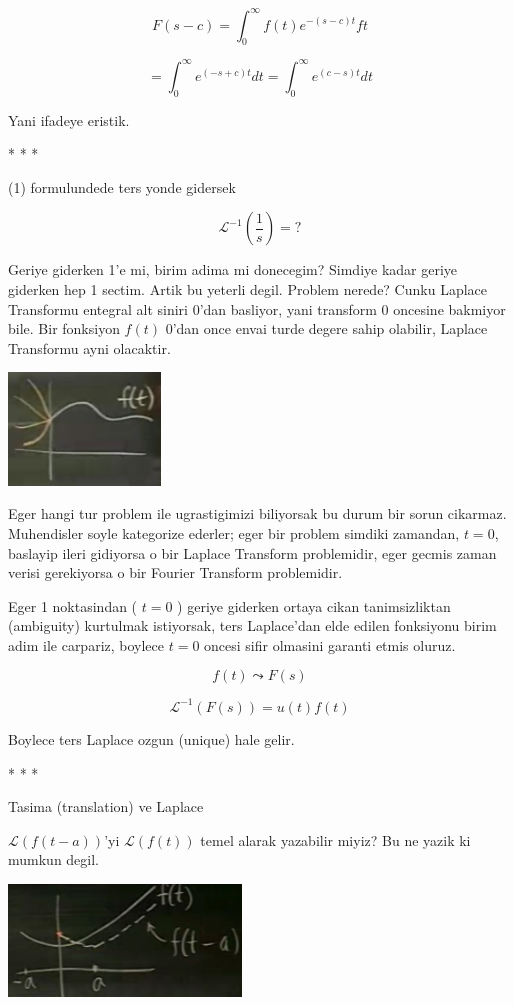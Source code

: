 \documentclass[12pt,fleqn]{article}
\begin{document}
\[ F(s-c) = \int _{0}^{\infty} f(t) e^{-(s-c)t} ft  \]

\[ = \int _{0}^{\infty} e^{(-s+c)t} dt  = \int _{0}^{\infty} e^{(c-s)t} dt   \]

Yani ifadeye eristik. 

* * *

(1) formulundede ters yonde gidersek

\[ \mathcal{L}^{-1}(\frac{1}{s}) = ?  \]

Geriye giderken 1'e mi, birim adima mi donecegim? Simdiye kadar geriye
giderken hep 1 sectim. Artik bu yeterli degil. Problem nerede? Cunku
Laplace Transformu entegral alt siniri 0'dan basliyor, yani transform 0
oncesine bakmiyor bile. Bir fonksiyon $f(t)$ 0'dan once envai turde degere
sahip olabilir, Laplace Transformu ayni olacaktir. 

\includegraphics[height=3cm]{22_6.png}

Eger hangi tur problem ile ugrastigimizi biliyorsak bu durum bir sorun
cikarmaz. Muhendisler soyle kategorize ederler; eger bir problem simdiki
zamandan, $t=0$, baslayip ileri gidiyorsa o bir Laplace Transform
problemidir, eger gecmis zaman verisi gerekiyorsa o bir Fourier Transform
problemidir. 

Eger 1 noktasindan ( $t=0$ ) geriye giderken ortaya cikan tanimsizliktan
(ambiguity) kurtulmak istiyorsak, ters Laplace'dan elde edilen fonksiyonu
birim adim ile carpariz, boylece $t=0$ oncesi sifir olmasini garanti etmis
oluruz.

\[ f(t) \leadsto F(s) \]

\[ \mathcal{L}^{-1}(F(s)) = u(t)f(t) \]

Boylece ters Laplace ozgun (unique) hale gelir.

* * * 

Tasima (translation) ve Laplace 

$\mathcal{L}(f(t-a))$'yi $\mathcal{L}(f(t))$ temel alarak yazabilir miyiz?
Bu ne yazik ki mumkun degil. 

\includegraphics[height=3cm]{22_7.png}
\end{document}
